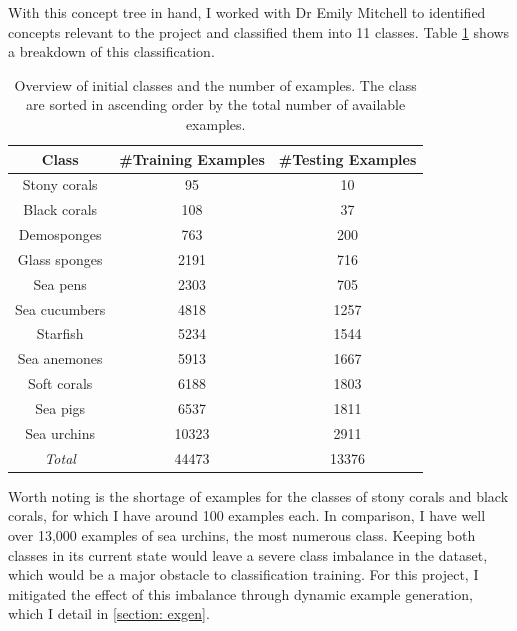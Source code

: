 \documentclass[12pt,a4paper,twoside,openany]{report}
\begin{document}
With this concept tree in hand, I worked with Dr Emily Mitchell to identified concepts relevant to the project and classified them into 11 classes. Table \ref{table:class_breakdown} shows a breakdown of this classification. 
\begin{table}[H]
    \begin{center}
        \begin{tabular}{||c c c||}
            \hline
             \textbf{Class} & \textbf{\#Training Examples}  & \textbf{\#Testing Examples} \\
             \hline
             \hline 
             Stony corals   & 95    &   10\\
             Black corals   & 108   &   37\\
             Demosponges    & 763   &   200\\
             Glass sponges  & 2191  &   716\\
             Sea pens       & 2303  &   705\\
             Sea cucumbers  & 4818  &   1257\\
             Starfish       & 5234  &   1544\\
             Sea anemones   & 5913  &   1667\\
             Soft corals    & 6188  &   1803\\
             Sea pigs       & 6537  &   1811\\
             Sea urchins    & 10323 &   2911\\
             \hline
             \hline
             \textit{Total} & 44473 &  13376\\
             \hline
        \end{tabular}
    \caption{\label{table:class_breakdown} Overview of initial classes and the number of examples. The class are sorted in ascending order by the total number of available examples.}
    \end{center}
\end{table}

Worth noting is the shortage of examples for the classes of stony corals and black corals, for which I have around 100 examples each. In comparison, I have well over 13,000 examples of sea urchins, the most numerous class. Keeping both classes in its current state would leave a severe class imbalance in the dataset, which would be a major obstacle to classification training. For this project, I mitigated the effect of this imbalance through dynamic example generation, which I detail in \ref{section: exgen}.
\end{document}

